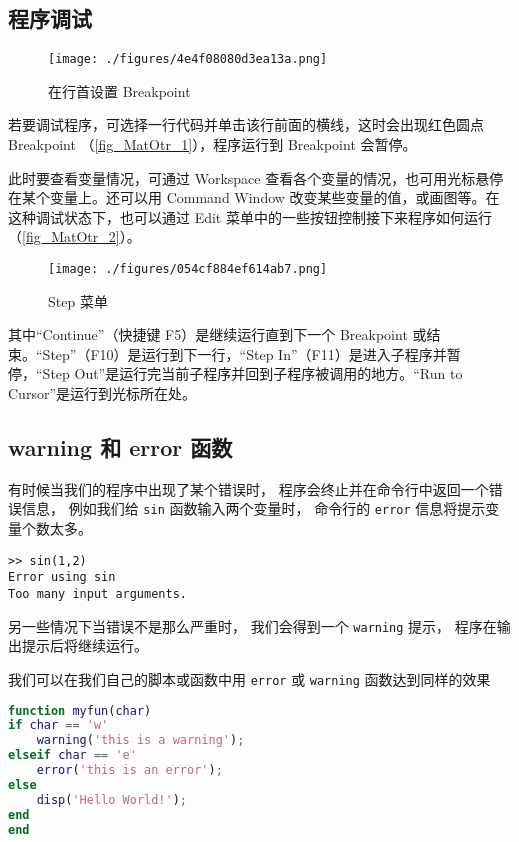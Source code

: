

\subsection{程序调试}
\begin{figure}[ht]
\centering
\texttt{[image: ./figures/4e4f08080d3ea13a.png]}
\caption{在行首设置 Breakpoint}\label{fig_MatOtr_1}
\end{figure}

若要调试程序，可选择一行代码并单击该行前面的横线，这时会出现红色圆点 Breakpoint （\autoref{fig_MatOtr_1}），程序运行到 Breakpoint 会暂停。

此时要查看变量情况，可通过 Workspace 查看各个变量的情况，也可用光标悬停在某个变量上。还可以用 Command Window 改变某些变量的值，或画图等。在这种调试状态下，也可以通过 Edit 菜单中的一些按钮控制接下来程序如何运行（\autoref{fig_MatOtr_2}）。
\begin{figure}[ht]
\centering
\texttt{[image: ./figures/054cf884ef614ab7.png]}
\caption{Step 菜单}\label{fig_MatOtr_2}
\end{figure}
其中“Continue”（快捷键 F5）是继续运行直到下一个 Breakpoint 或结束。“Step”（F10）是运行到下一行，“Step In”（F11）是进入子程序并暂停，“Step Out”是运行完当前子程序并回到子程序被调用的地方。“Run to Cursor”是运行到光标所在处。

\subsection{warning 和 error 函数}
有时候当我们的程序中出现了某个错误时， 程序会终止并在命令行中返回一个错误信息， 例如我们给 \verb`sin` 函数输入两个变量时， 命令行的 \verb`error` 信息将提示变量个数太多。
\begin{lstlisting}[language=matlabC]
>> sin(1,2)
Error using sin
Too many input arguments.
\end{lstlisting}
另一些情况下当错误不是那么严重时， 我们会得到一个 \verb`warning` 提示， 程序在输出提示后将继续运行。

我们可以在我们自己的脚本或函数中用 \verb`error` 或 \verb`warning` 函数达到同样的效果

\begin{lstlisting}[language=matlab]
function myfun(char)
if char == 'w'
    warning('this is a warning');
elseif char == 'e'
    error('this is an error');
else
    disp('Hello World!');
end
end
\end{lstlisting}

